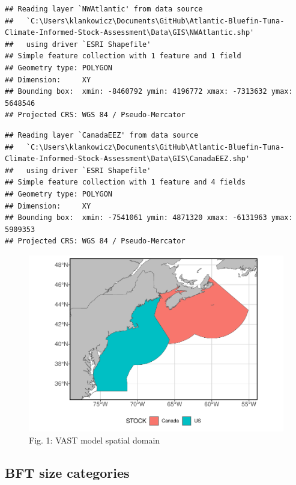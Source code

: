 \documentclass[
]{article}
\begin{document}
\begin{verbatim}
## Reading layer `NWAtlantic' from data source 
##   `C:\Users\klankowicz\Documents\GitHub\Atlantic-Bluefin-Tuna-Climate-Informed-Stock-Assessment\Data\GIS\NWAtlantic.shp' 
##   using driver `ESRI Shapefile'
## Simple feature collection with 1 feature and 1 field
## Geometry type: POLYGON
## Dimension:     XY
## Bounding box:  xmin: -8460792 ymin: 4196772 xmax: -7313632 ymax: 5648546
## Projected CRS: WGS 84 / Pseudo-Mercator
\end{verbatim}

\begin{verbatim}
## Reading layer `CanadaEEZ' from data source 
##   `C:\Users\klankowicz\Documents\GitHub\Atlantic-Bluefin-Tuna-Climate-Informed-Stock-Assessment\Data\GIS\CanadaEEZ.shp' 
##   using driver `ESRI Shapefile'
## Simple feature collection with 1 feature and 4 fields
## Geometry type: POLYGON
## Dimension:     XY
## Bounding box:  xmin: -7541061 ymin: 4871320 xmax: -6131963 ymax: 5909353
## Projected CRS: WGS 84 / Pseudo-Mercator
\end{verbatim}

\begin{figure}
\centering
\includegraphics{Model_Prelim_Report_files/figure-latex/spatial-domain-1.pdf}
\caption{\label{fig:spatial-domain}Fig. 1: VAST model spatial domain}
\end{figure}

\hypertarget{bft-size-categories}{%
\subsection{BFT size categories}\label{bft-size-categories}}
\end{document}
